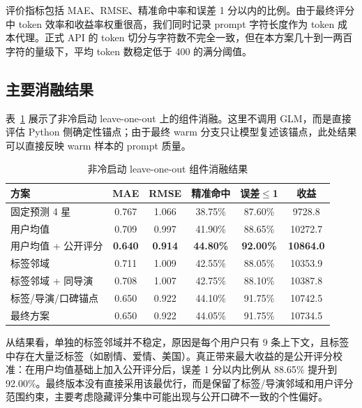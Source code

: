 \documentclass[UTF8,a4paper,10pt,fontset=none]{ctexart}
\begin{document}
评价指标包括 MAE、RMSE、精准命中率和误差 1 分以内的比例。由于最终评分中 token 效率和收益率权重很高，我们同时记录 prompt 字符长度作为 token 成本代理。正式 API 的 token 切分与字符数不完全一致，但在本方案几十到一两百字符的量级下，平均 token 数稳定低于 400 的满分阈值。

\subsection{主要消融结果}

表~\ref{tab:ablation} 展示了非冷启动 leave-one-out 上的组件消融。这里不调用 GLM，而是直接评估 Python 侧确定性锚点；由于最终 warm 分支只让模型复述该锚点，此处结果可以直接反映 warm 样本的 prompt 质量。

\begin{table}[htbp]
    \centering
    \setlength{\tabcolsep}{4.5pt}
    \caption{非冷启动 leave-one-out 组件消融结果}
    \label{tab:ablation}
    \small
    \begin{tabular}{@{}lccccc@{}}
        \toprule
        \textbf{方案} & \textbf{MAE} & \textbf{RMSE} & \textbf{精准命中} & \textbf{误差$\le$1} & \textbf{收益} \\
        \midrule
        固定预测 4 星 & 0.767 & 1.066 & 38.75\% & 87.60\% & 9728.8 \\
        用户均值 & 0.709 & 0.997 & 41.90\% & 88.65\% & 10272.7 \\
        用户均值 + 公开评分 & \textbf{0.640} & \textbf{0.914} & \textbf{44.80\%} & \textbf{92.00\%} & \textbf{10864.0} \\
        标签邻域 & 0.711 & 1.009 & 42.55\% & 88.05\% & 10353.9 \\
        标签邻域 + 同导演 & 0.708 & 1.007 & 42.75\% & 88.10\% & 10387.8 \\
        标签/导演/口碑锚点 & 0.650 & 0.922 & 44.10\% & 91.75\% & 10742.5 \\
        最终方案 & 0.650 & 0.922 & 44.05\% & 91.75\% & 10734.5 \\
        \bottomrule
    \end{tabular}
\end{table}

从结果看，单独的标签邻域并不稳定，原因是每个用户只有 9 条上下文，且标签中存在大量泛标签（如剧情、爱情、美国）。真正带来最大收益的是公开评分校准：在用户均值基础上加入公开评分后，误差 1 分以内比例从 88.65\% 提升到 92.00\%。最终版本没有直接采用该最优行，而是保留了标签/导演邻域和用户评分范围约束，主要考虑隐藏评分集中可能出现与公开口碑不一致的个性偏好。
\end{document}
